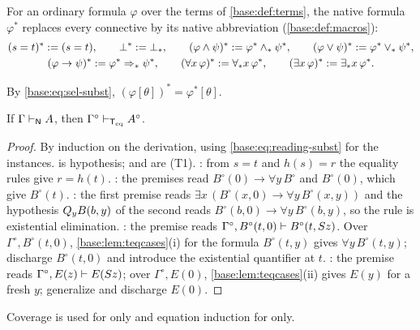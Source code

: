 \begin{definition}
\label{base:def:star}
For an ordinary formula $\varphi$ over the terms of \cref{base:def:terms},
the native formula $\varphi^{*}$ replaces every connective by its native
abbreviation (\cref{base:def:macros}):
\begin{gather*}
 (s=t)^{*}\mathrel{:=}(s=t),\qquad \bot^{*}\mathrel{:=}\bot_*,\qquad
 (\varphi\wedge\psi)^{*}\mathrel{:=}\varphi^{*}\wedge_*\psi^{*},\qquad
 (\varphi\vee\psi)^{*}\mathrel{:=}\varphi^{*}\vee_*\psi^{*},\\
 (\varphi\to\psi)^{*}\mathrel{:=}\varphi^{*}\Rightarrow_*\psi^{*},\qquad
 (\forall x\,\varphi)^{*}\mathrel{:=}\forall_* x\,\varphi^{*},\qquad
 (\exists x\,\varphi)^{*}\mathrel{:=}\exists_* x\,\varphi^{*}.
\end{gather*}
\end{definition}

By \eqref{base:eq:sel-subst}, $(\varphi[\theta])^{*}=\varphi^{*}[\theta]$.

\begin{proposition}
\label{base:prop:sound}
If $\Gamma\vdash_{\mathsf{N}}A$, then $\Gamma^\circ\vdash_{\mathsf{T}_{\mathrm{eq}}}A^\circ$.
\end{proposition}

\begin{proof}
By induction on the derivation, using \eqref{base:eq:reading-subst} for the
instances.   is hypothesis;  and 
are (T1).  : from $s=t$ and $h(s)=r$ the equality rules give
$r=h(t)$.  : the premises read $B^\circ(0)\to\forall y\,B^\circ$
and $B^\circ(0)$, which give $B^\circ(t)$.  : the first premise
reads $\exists x\,(B^\circ(x,0)\to\forall y\,B^\circ(x,y))$ and the
hypothesis $Q_{y}B(b,y)$ of the second reads
$B^\circ(b,0)\to\forall y\,B^\circ(b,y)$, so the rule is existential
elimination.  : the premise reads
$\Gamma^\circ,B^\circ(t,0)\vdash B^\circ(t,S z)$.  Over
$\Gamma^\circ,B^\circ(t,0)$, \cref{base:lem:teqcases}(i) for the formula
$B^\circ(t,y)$ gives $\forall y\,B^\circ(t,y)$; discharge $B^\circ(t,0)$ and
introduce the existential quantifier at $t$.  : the premise
reads $\Gamma^\circ,E(z)\vdash E(S z)$; over $\Gamma^\circ,E(0)$,
\cref{base:lem:teqcases}(ii) gives $E(y)$ for a fresh $y$; generalize and
discharge $E(0)$.
\end{proof}

Coverage is used for  only and equation induction for
 only.

